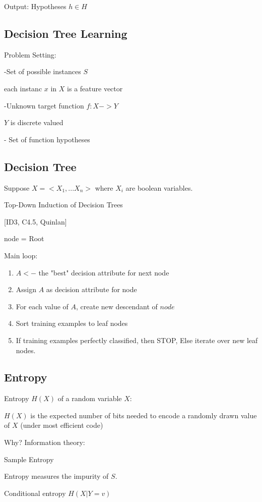 \documentclass[twoside]{article}
\begin{document}
Output:
Hypotheses $h\in H$ 


\subsection{Decision Tree Learning}

Problem Setting:

-Set of possible instances $S$

each instanc $x$ in $X$ is a feature vector

-Unknown target function $f:X->Y$

$Y$ is discrete valued

- Set of function hypotheses ~

\subsection{Decision Tree}
Suppose $X=<X_1, ... X_n>$ where $X_i$ are boolean variables.

Top-Down Induction of Decision Trees

[ID3, C4.5, Quinlan]

node = Root

Main loop:
\begin{enumerate}
\item $A<-$ the "best" decision attribute for next node
\item Assign $A$ as decision attribute for node
\item For each value of $A$, create new descendant of $node$
\item Sort training examples to leaf nodes
\item If training examples perfectly classified, then STOP, Else iterate over new leaf nodes.
\end{enumerate}

\subsection{Entropy}

Entropy $H(X)$ of a random variable $X$:


$H(X)$ is the expected number of bits needed to encode a randomly drawn value of $X$ (under most efficient code)

Why? Information theory:

Sample Entropy

Entropy measures the impurity of $S$.

Conditional entropy $H(X|Y = v)$
\end{document}
